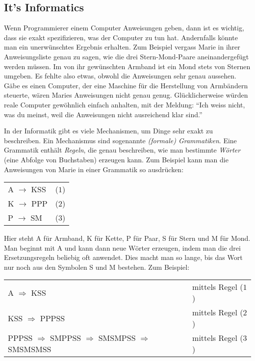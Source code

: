 \documentclass[a4paper,11pt]{report}
\makeatletter
\renewenvironment{adjustwidth}[2]{%
    \begin{list}{}{%
    \partopsep\z@%
    \topsep\z@%
    \listparindent\parindent%
    \parsep\parskip%
    \@ifmtarg{#1}{\setlength{\leftmargin}{\z@}}%
                 {\setlength{\leftmargin}{#1}}%
    \@ifmtarg{#2}{\setlength{\rightmargin}{\z@}}%
                 {\setlength{\rightmargin}{#2}}%
    }
    \item[]}{\end{list}}
\makeatother
\begin{document}
\subsection*{It’s Informatics}

Wenn Programmierer einem Computer Anweisungen geben, dann ist es wichtig, dass sie exakt spezifizieren, was der Computer zu tun hat. Andernfalls könnte man ein unerwünschtes Ergebnis erhalten. Zum Beispiel vergass Marie in ihrer Anweisungsliste genau zu sagen, wie die drei Stern-Mond-Paare aneinandergefügt werden müssen. Im von ihr gewünschten Armband ist ein Mond stets von Sternen umgeben. Es fehlte also etwas, obwohl die Anweisungen sehr genau aussehen. Gäbe es einen Computer, der eine Maschine für die Herstellung von Armbändern steuerte, wären Maries Anweisungen nicht genau genug. Glücklicherweise würden reale Computer gewöhnlich einfach anhalten, mit der Meldung: “Ich weiss nicht, was du meinst, weil die Anweisungen nicht ausreichend klar sind.”

In der Informatik gibt es viele Mechanismen, um Dinge sehr exakt zu beschreiben. Ein Mechanismus sind sogenannte \emph{(formale) Grammatiken}. Eine Grammatik enthält \emph{Regeln}, die genau beschreiben, wie man bestimmte \emph{Wörter} (eine Abfolge von Buchstaben) erzeugen kann. Zum Beispiel kann man die Anweisungen von Marie in einer Grammatik so ausdrücken:

\begin{adjustwidth}{1.5em}{0em}
\begin{tabular}{ @{} l l @{} }
  A \ensuremath{\rightarrow} KSS & ($1$) \\ 
  K \ensuremath{\rightarrow} PPP & ($2$) \\ 
  P \ensuremath{\rightarrow} SM & ($3$)
\end{tabular}


\end{adjustwidth}

Hier steht A für Armband, K für Kette, P für Paar, S für Stern und M für Mond. Man beginnt mit A und kann dann neue Wörter erzeugen, indem man die drei Ersetzungsregeln beliebig oft anwendet. Dies macht man so lange, bis das Wort nur noch aus den Symbolen S und M bestehen. Zum Beispiel:

\begin{adjustwidth}{1.5em}{0em}
\begin{tabular}{ @{} l l @{} }
  A \ensuremath{\Rightarrow} KSS & mittels Regel ($1$) \\ 
  KSS \ensuremath{\Rightarrow} PPPSS & mittels Regel ($2$) \\ 
  PPPSS \ensuremath{\Rightarrow} SMPPSS \ensuremath{\Rightarrow} SMSMPSS \ensuremath{\Rightarrow} SMSMSMSS & mittels Regel ($3$)
\end{tabular}


\end{adjustwidth}
\end{document}
